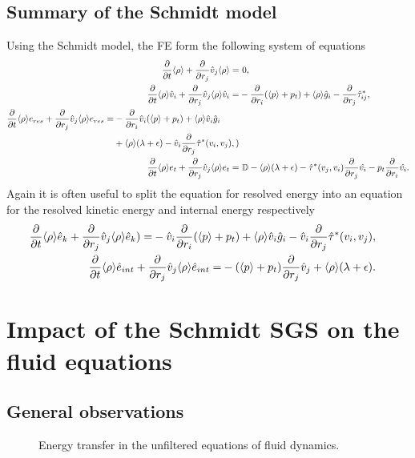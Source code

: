 \subsection{Summary of the Schmidt model}
Using the Schmidt model, the FE form the following system of equations
\begin{align}
\frac{\partial}{\partial t}\langle \rho \rangle + \frac{\partial}{\partial r_j}\hat{v}_j\langle \rho \rangle =&\ 0,\\
\frac{\partial}{\partial t}\langle \rho \rangle\hat{v}_i + \frac{\partial}{\partial r_j}\hat{v}_j\langle \rho \rangle\hat{v}_i =&
-\frac{\partial}{\partial r_i}(\langle p \rangle+p_t)+\langle \rho \rangle\hat{g}_i
-\frac{\partial}{\partial r_j}\hat{\tau}^*_{ij},
\\
\begin{split}
\frac{\partial}{\partial t}\langle \rho \rangle e_{res}+\frac{\partial}{\partial r_j}\hat{v}_j\langle \rho \rangle e_{res}=&
-\frac{\partial}{\partial r_i}\hat{v}_i(\langle p \rangle+p_t)
+\langle \rho \rangle\hat{v}_i\hat{g}_i\\
&+\langle \rho \rangle(\lambda+\epsilon)
-\hat{v}_i\frac{\partial}{\partial r_j}\hat{\tau}^*(v_i,v_j),
)
\end{split}
\\
\frac{\partial}{\partial t}\langle \rho \rangle e_t+\frac{\partial}{\partial r_j}\hat{v}_j
\langle \rho \rangle e_t=&\ \mathbb{D}-\langle \rho \rangle(\lambda+\epsilon)
-\hat{\tau}^*(v_j,v_i)\frac{\partial}{\partial r_j}\hat{v_i}-p_t\frac{\partial}{\partial r_i}\hat{v_i}.
\end{align}
Again it is often useful to split the equation for resolved energy into an
equation for the resolved kinetic energy and internal energy respectively
\begin{align}
\begin{split}
\frac{\partial}{\partial t}\langle \rho \rangle \hat{e}_k+\frac{\partial}{\partial r_j}\hat{v}_j \langle \rho \rangle \hat{e}_k) =& 
-\hat{v}_i \frac{\partial}{\partial r_i}(\langle p \rangle+p_t)
+\langle \rho \rangle \hat{v}_i \hat{g}_i
-\hat{v}_i\frac{\partial}{\partial r_j}\hat{\tau}^*(v_i,v_j),
\end{split}
\\
\begin{split}
\frac{\partial}{\partial t}\langle \rho \rangle \hat{e}_{int}+\frac{\partial}{\partial r_j}\hat{v}_j \langle \rho \rangle \hat{e}_{int} =&
-(\langle p \rangle+p_t) \frac{\partial}{\partial r_j}\hat{v}_j
+\langle \rho \rangle(\lambda+\epsilon).
\end{split}
\end{align}

\section{Impact of the Schmidt SGS on the fluid equations}\label{ImpactSGS}
\subsection{General observations}
\begin{figure}
\centering
\resizebox{0.7\textwidth}{!}{
%
}
\caption{Energy transfer in the unfiltered equations of fluid dynamics.} 
\label{fig:UE}
\end{figure}


